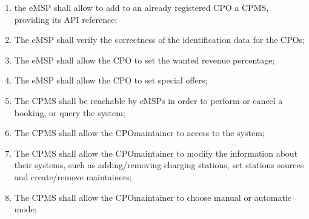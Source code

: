 \begin{enumerate}[label=\textbf{R\arabic*}]
    \item the \ac{eMSP} shall allow to add to an already registered \ac{CPO} a \ac{CPMS}, providing its \ac{API} reference;\label{req:eMSP-add-cpms}
    \item The \ac{eMSP} shall verify the correctness of the identification data for the \acp{CPO};\label{req:eMSP-correct-cpo-info}
    \item The \ac{eMSP} shall allow the \ac{CPO} to set the wanted revenue percentage;\label{req:eMSP-set-revenue}
    \item The \ac{eMSP} shall allow the \ac{CPO} to set special offers;\label{req:eMSP-set-special-offers}
    \item The \ac{CPMS} shall be reachable by \acp{eMSP} in order to perform or cancel a booking, or query the system;\label{req:CPMS-reachable}
    \item The \ac{CPMS} shall allow the \ac{CPO}maintainer to access to the system;\label{req:CPMS-accessible}
    \item The \ac{CPMS} shall allow the \ac{CPO}maintainer to modify the information about their systems, such as adding/removing charging stations, set stations sources and create/remove maintainers;\label{req:CPMS-modify-cpo-infos}
    \item The \ac{CPMS} shall allow the \ac{CPO}maintainer to choose manual or automatic mode;\label{req:CPMS-select-mode}
\end{enumerate}

